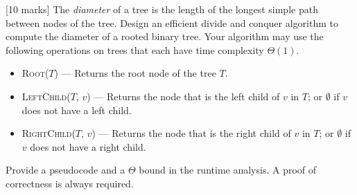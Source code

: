 {[10 marks]} The {\it diameter} of a tree is the length of the longest simple path
between nodes of the tree. Design an efficient divide and conquer algorithm to compute the diameter of a rooted binary tree. Your algorithm may use the following operations on trees that each have time complexity $\Theta(1)$.
\begin{itemize}
    \item \textsc{Root}($T$) --- Returns the root node of the tree $T$.
    \item \textsc{LeftChild}($T$, $v$) --- Returns the node that is the left child of $v$ in $T$; or $\emptyset$ if $v$ does not have a left child.
    \item \textsc{RightChild}($T$, $v$) --- Returns the node that is the right child of $v$ in $T$; or $\emptyset$ if $v$ does not have a right child.
\end{itemize}

Provide a pseudocode and a $\Theta$ bound in the runtime analysis. A proof of correctness is always required.

